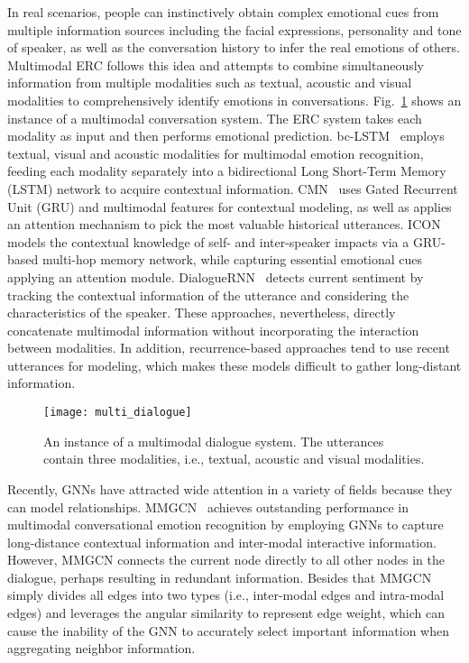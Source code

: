 \documentclass[lettersize,journal]{IEEEtran}
\begin{document}
In real scenarios, people can instinctively obtain complex emotional cues from multiple information sources including the facial expressions, personality and tone of speaker, as well as the conversation history to infer the real emotions of others. Multimodal ERC follows this idea and attempts to combine simultaneously information from multiple modalities such as textual, acoustic and visual modalities to comprehensively identify emotions in conversations. Fig.~\ref{fig:multi_dialogue} shows an instance of a multimodal conversation system. The ERC system takes each modality as input and then performs emotional prediction. bc-LSTM~\cite{poria2017context} employs textual, visual and acoustic modalities for multimodal emotion recognition, feeding each modality separately into a bidirectional Long Short-Term Memory (LSTM) network to acquire contextual information. CMN~\cite{hazarika2018conversational} uses Gated Recurrent Unit (GRU) and multimodal features for contextual modeling, as well as applies an attention mechanism to pick the most valuable historical utterances. ICON~\cite{hazarika2018icon} models the contextual knowledge of self- and inter-speaker impacts via a GRU-based multi-hop memory network, while capturing essential emotional cues applying an attention module. DialogueRNN~\cite{majumder2019dialoguernn} detects current sentiment by tracking the contextual information of the utterance and considering the characteristics of the speaker. These approaches, nevertheless, directly concatenate multimodal information without incorporating the interaction between modalities. In addition, recurrence-based approaches tend to use recent utterances for modeling, which makes these models difficult to gather long-distant information.
\begin{figure}[htbp]
\centering
\texttt{[image: multi\_dialogue]}
\caption{An instance of a multimodal dialogue system. The utterances contain three modalities, i.e., textual, acoustic and visual modalities.}
\label{fig:multi_dialogue}
\end{figure}

Recently, GNNs have attracted wide attention in a variety of fields because they can model relationships. MMGCN~\cite{hu2021mmgcn} achieves outstanding performance in multimodal conversational emotion recognition by employing GNNs to capture long-distance contextual information and inter-modal interactive information. However, MMGCN connects the current node directly to all other nodes in the dialogue, perhaps resulting in redundant information. Besides that MMGCN simply divides all edges into two types (i.e., inter-modal edges and intra-modal edges) and leverages the angular similarity to represent edge weight, which can cause the inability of the GNN to accurately select important information when aggregating neighbor information.
\end{document}
